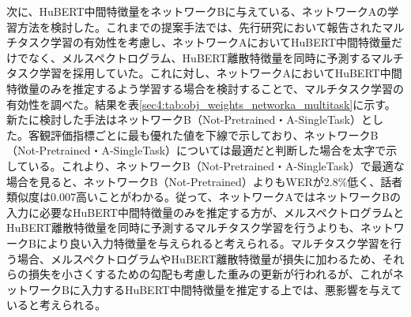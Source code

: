 \documentclass[12pt]{jarticle}
\numberwithin{equation}{section}    %
\numberwithin{figure}{section}      %
\numberwithin{table}{section}      %
\begin{document}
次に、HuBERT中間特徴量をネットワークBに与えている、ネットワークAの学習方法を検討した。これまでの提案手法では、先行研究\cite{kim2023lip_multitask, choi2023intelligible}において報告されたマルチタスク学習の有効性を考慮し、ネットワークAにおいてHuBERT中間特徴量だけでなく、メルスペクトログラム、HuBERT離散特徴量を同時に予測するマルチタスク学習を採用していた。これに対し、ネットワークAにおいてHuBERT中間特徴量のみを推定するよう学習する場合を検討することで、マルチタスク学習の有効性を調べた。結果を表\ref{sec4:tab:obj_weights_networka_multitask}に示す。新たに検討した手法はネットワークB（Not-Pretrained・A-SingleTask）とした。客観評価指標ごとに最も優れた値を下線で示しており、ネットワークB（Not-Pretrained・A-SingleTask）については最適だと判断した場合を太字で示している。これより、ネットワークB（Not-Pretrained・A-SingleTask）で最適な場合を見ると、ネットワークB（Not-Pretrained）よりもWERが2.8\%低く、話者類似度は0.007高いことがわかる。従って、ネットワークAではネットワークBの入力に必要なHuBERT中間特徴量のみを推定する方が、メルスペクトログラムとHuBERT離散特徴量を同時に予測するマルチタスク学習を行うよりも、ネットワークBにより良い入力特徴量を与えられると考えられる。マルチタスク学習を行う場合、メルスペクトログラムやHuBERT離散特徴量が損失に加わるため、それらの損失を小さくするための勾配も考慮した重みの更新が行われるが、これがネットワークBに入力するHuBERT中間特徴量を推定する上では、悪影響を与えていると考えられる。
\end{document}
